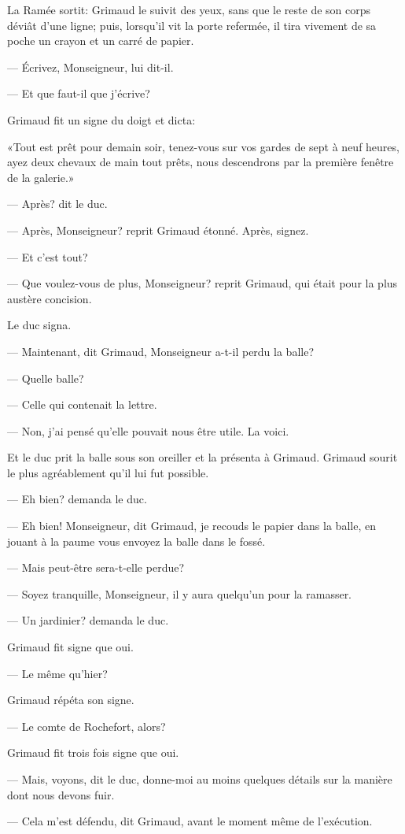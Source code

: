La Ramée sortit: Grimaud le suivit des yeux, sans que le reste de son corps déviât d'une ligne; puis, lorsqu'il vit la porte refermée, il tira vivement de sa poche un crayon et un carré de papier.

— Écrivez, Monseigneur, lui dit-il.

— Et que faut-il que j'écrive?

Grimaud fit un signe du doigt et dicta:

«Tout est prêt pour demain soir, tenez-vous sur vos gardes de sept à neuf heures, ayez deux chevaux de main tout prêts, nous descendrons par la première fenêtre de la galerie.»

— Après? dit le duc.

— Après, Monseigneur? reprit Grimaud étonné. Après, signez.

— Et c'est tout?

— Que voulez-vous de plus, Monseigneur? reprit Grimaud, qui était pour la plus austère concision.

Le duc signa.

— Maintenant, dit Grimaud, Monseigneur a-t-il perdu la balle?

— Quelle balle?

— Celle qui contenait la lettre.

— Non, j'ai pensé qu'elle pouvait nous être utile. La voici.

Et le duc prit la balle sous son oreiller et la présenta à Grimaud.
Grimaud sourit le plus agréablement qu'il lui fut possible.

— Eh bien? demanda le duc.

— Eh bien! Monseigneur, dit Grimaud, je recouds le papier dans la balle, en jouant à la paume vous envoyez la balle dans le fossé.

— Mais peut-être sera-t-elle perdue?

— Soyez tranquille, Monseigneur, il y aura quelqu'un pour la ramasser.

— Un jardinier? demanda le duc.

Grimaud fit signe que oui.

— Le même qu'hier?

Grimaud répéta son signe.

— Le comte de Rochefort, alors?

Grimaud fit trois fois signe que oui.

— Mais, voyons, dit le duc, donne-moi au moins quelques détails sur la manière dont nous devons fuir.

— Cela m'est défendu, dit Grimaud, avant le moment même de l'exécution.


